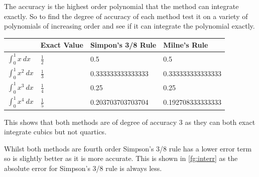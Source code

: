 \documentclass[a4paper,11pt]{article}
\begin{document}
\begin{enumerate}
\begin{enumerate}
		The accuracy is the highest order polynomial that the method can 
		integrate exactly. So to find the degree of accuracy of each method 
		test it on a variety of polynomials of increasing order and see if it 
		can integrate the polynomial exactly.
		
		\begin{center}
			\begin{tabular}{l|lll}
				& Exact Value    & Simpon's 3/8 Rule & Milne's Rule      \\ 
				\hline
				$\int_{0}^{1}x \ dx$     & $\frac{1}{2}$ & 0.5               
				& 0.5               \\
				$\int_{0}^{1}x^{2} \ dx$ & $\frac{1}{3}$ & 0.333333333333333 
				& 0.333333333333333 \\
				$\int_{0}^{1}x^{3} \ dx$ & $\frac{1}{4}$ & 0.25              
				& 0.25              \\
				$\int_{0}^{1}x^{4} \ dx$ & $\frac{1}{5}$ & 0.203703703703704 
				& 0.192708333333333
			\end{tabular}
		\end{center}
		This shows that both methods are of degree of accuracy 3 as they can 
		both exact integrate cubics but not quartics.
		
		Whilst both methods are fourth order Simpson's 3/8 rule has a lower 
		error term so is slightly better as it is more accurate. This is 
		shown in \autoref{fg:interr} as the absolute error for Simpson's 
		3/8 rule is always less.
	\end{enumerate}


\end{enumerate}
\end{document}
